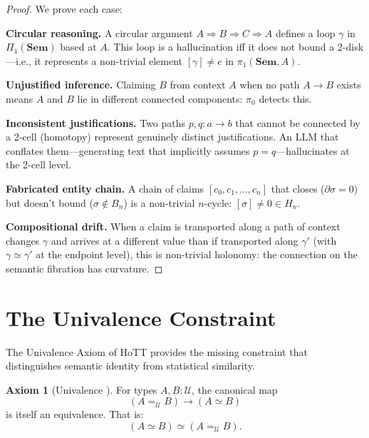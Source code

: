 \documentclass[11pt,a4paper,twocolumn]{article}
\theoremstyle{plain}
\theoremstyle{definition}
\newtheorem{axiom}[theorem]{Axiom}
\newcommand{\Sem}{\mathbf{Sem}}
\begin{document}
\begin{proof}
We prove each case:

\textbf{Circular reasoning.} A circular argument $A \Rightarrow B \Rightarrow C \Rightarrow A$ defines a loop $\gamma$ in $\Pi_1(\Sem)$ based at $A$. This loop is a hallucination iff it does not bound a 2-disk---i.e., it represents a non-trivial element $[\gamma] \neq e$ in $\pi_1(\Sem, A)$.

\textbf{Unjustified inference.} Claiming $B$ from context $A$ when no path $A \to B$ exists means $A$ and $B$ lie in different connected components: $\pi_0$ detects this.

\textbf{Inconsistent justifications.} Two paths $p, q\colon a \to b$ that cannot be connected by a 2-cell (homotopy) represent genuinely distinct justifications. An LLM that conflates them---generating text that implicitly assumes $p = q$---hallucinates at the 2-cell level.

\textbf{Fabricated entity chain.} A chain of claims $[c_0, c_1, \ldots, c_n]$ that closes ($\partial \sigma = 0$) but doesn't bound ($\sigma \notin B_n$) is a non-trivial $n$-cycle: $[\sigma] \neq 0 \in H_n$.

\textbf{Compositional drift.} When a claim is transported along a path of context changes $\gamma$ and arrives at a different value than if transported along $\gamma'$ (with $\gamma \simeq \gamma'$ at the endpoint level), this is non-trivial holonomy: the connection on the semantic fibration has curvature.
\end{proof}

\section{The Univalence Constraint}\label{sec:univalence}

The Univalence Axiom of HoTT provides the missing constraint that distinguishes semantic identity from statistical similarity.

\begin{axiom}[Univalence \cite{hottbook}]
For types $A, B : \mathcal{U}$, the canonical map
\[
  (A =_{\mathcal{U}} B) \to (A \simeq B)
\]
is itself an equivalence. That is:
\[
  (A \simeq B) \simeq (A =_{\mathcal{U}} B).
\]
\end{axiom}
\end{document}
